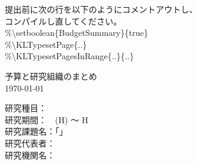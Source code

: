 \begingroup
		\LARGE
		提出前に次の行を以下のようにコメントアウトし、\\
		コンパイルし直してください。\\
		\hspace{2cm}\%\textbackslash setboolean\{BudgetSummary\}\{true\}\\
		\hspace{2cm}\%\textbackslash KLTypesetPage\{..\}\\
		\hspace{2cm}\%\textbackslash KLTypesetPagesInRange\{..\}\{..\}\\

	\begin{center}
		\LARGE 予算と研究組織のまとめ \\
		\Large \today
	\end{center}

	\Large
	\noindent
	研究種目：　\\
	研究期間：　(H) 〜 H\\
	研究課題名：「」\\
	研究代表者：\\
	研究機関名：\\
\endgroup
\clearpage

